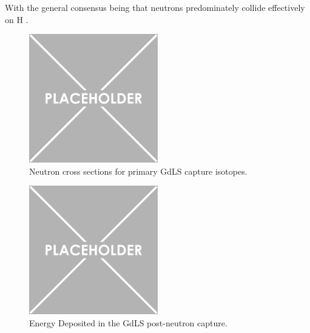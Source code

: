 \par
With the general consensus being that neutrons predominately collide effectively on H \cite{neutron_thermalisation_and_capture_ref}.


\begin{figure}
    \centering
    \includegraphics[width=0.5\textwidth]{Figures/Placeholder.png}
    \caption{Neutron cross sections for primary GdLS capture isotopes.}
    \label{fig:GdLS_capture_cross_section}
\end{figure}


\begin{figure}
    \centering
    \includegraphics[width=0.5\textwidth]{Figures/Placeholder.png}
    \caption{Energy Deposited in the GdLS post-neutron capture.}
    \label{fig:GdLS_energy_deposits_post_capture}
\end{figure}

